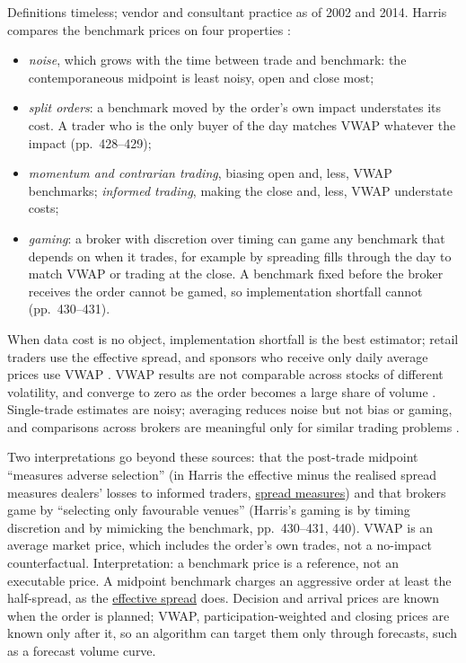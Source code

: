 \begin{qfdefinition}
 Definitions timeless; vendor and consultant practice as of 2002 and 2014. Harris compares the benchmark prices on four properties \citep[chap.~``Liquidity and Transaction Cost Measurement'', sec.~21.4, pp.~427--432, Table~21-1, p.~433]{alpha-harris}:
\begin{itemize}
\item \emph{noise}, which grows with the time between trade and benchmark: the contemporaneous midpoint is least noisy, open and close most;
\item \emph{split orders}: a benchmark moved by the order's own impact understates its cost. A trader who is the only buyer of the day matches VWAP whatever the impact (pp.~428--429);
\item \emph{momentum and contrarian trading}, biasing open and, less, VWAP benchmarks; \emph{informed trading}, making the close and, less, VWAP understate costs;
\item \emph{gaming}: a broker with discretion over timing can game any benchmark that depends on when it trades, for example by spreading fills through the day to match VWAP or trading at the close. A benchmark fixed before the broker receives the order cannot be gamed, so implementation shortfall cannot (pp.~430--431).
\end{itemize}

 When data cost is no object, implementation shortfall is the best estimator; retail traders use the effective spread, and sponsors who receive only daily average prices use VWAP \citep[same chap., pp.~426 and~431--432]{alpha-harris}. VWAP results are not comparable across stocks of different volatility, and converge to zero as the order becomes a large share of volume \citep[chap.~3, p.~107]{s7-kissellscience}. Single-trade estimates are noisy; averaging reduces noise but not bias or gaming, and comparisons across brokers are meaningful only for similar trading problems \citep[chap.~``Liquidity and Transaction Cost Measurement'', p.~432]{alpha-harris}.

 Two interpretations go beyond these sources: that the post-trade midpoint ``measures adverse selection'' (in Harris the effective minus the realised spread measures dealers' losses to informed traders, \hyperref[def:spread-measures]{spread measures}) and that brokers game by ``selecting only favourable venues'' (Harris's gaming is by timing discretion and by mimicking the benchmark, pp.~430--431, 440). VWAP is an average market price, which includes the order's own trades, not a no-impact counterfactual. Interpretation: a benchmark price is a reference, not an executable price. A midpoint benchmark charges an aggressive order at least the half-spread, as the \hyperref[def:spread-measures]{effective spread} does. Decision and arrival prices are known when the order is planned; VWAP, participation-weighted and closing prices are known only after it, so an algorithm can target them only through forecasts, such as a forecast volume curve.


\end{qfdefinition}

